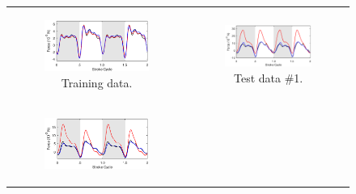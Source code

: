 \documentclass[fleqn,10pt]{wlscirep}
\begin{document}
\begin{figure}[ht]
\centering
\begin{tabular}{cc}
\begin{subfigure}{0.48\textwidth}
\centering
\includegraphics[width=\textwidth]{figures/eq_goodbad_1}
\caption{\label{fig:eq_goodbad_1} Training data.}
\end{subfigure} &
\begin{subfigure}{0.48\textwidth}
\centering
\includegraphics[width=\textwidth]{figures/eq_goodbad_2}
\caption{\label{fig:eq_goodbad_2} Test data \#1.}
\end{subfigure} \\
\begin{subfigure}{0.48\textwidth}
\centering
\includegraphics[width=\textwidth]{figures/eq_goodbad_3}

\end{subfigure}
\end{tabular}
\end{figure}
\end{document}
